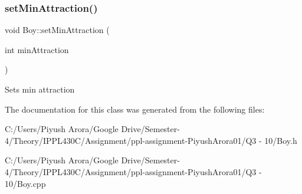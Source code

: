 \subsubsection{\texorpdfstring{set\+Min\+Attraction()}{setMinAttraction()}}
{\footnotesize\ttfamily void Boy\+::set\+Min\+Attraction (\begin{DoxyParamCaption}\item[{int}]{min\+Attraction }\end{DoxyParamCaption})}

Sets min attraction 

The documentation for this class was generated from the following files\+:\begin{DoxyCompactItemize}
\item 
C\+:/\+Users/\+Piyush Arora/\+Google Drive/\+Semester-\/4/\+Theory/\+I\+P\+P\+L430\+C/\+Assignment/ppl-\/assignment-\/\+Piyush\+Arora01/\+Q3 -\/ 10/Boy.\+h\item 
C\+:/\+Users/\+Piyush Arora/\+Google Drive/\+Semester-\/4/\+Theory/\+I\+P\+P\+L430\+C/\+Assignment/ppl-\/assignment-\/\+Piyush\+Arora01/\+Q3 -\/ 10/Boy.\+cpp\end{DoxyCompactItemize}
